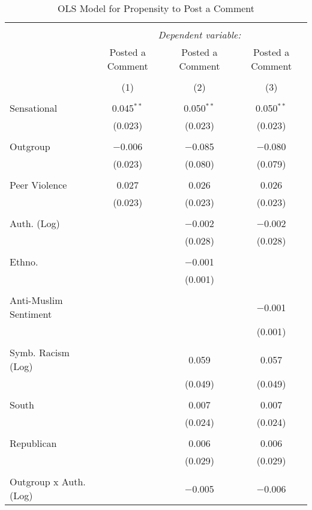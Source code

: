 
\begin{table}[H] \centering 
  \caption{OLS Model for Propensity to Post a Comment} 
  \label{} 
\begin{tabular}{@{\extracolsep{5pt}}lccc} 
\\[-1.8ex]\hline 
\hline \\[-1.8ex] 
 & \multicolumn{3}{c}{\textit{Dependent variable:}} \\ 
\cline{2-4} 
 & Posted a Comment & Posted a Comment & Posted a Comment \\ 
\\[-1.8ex] & (1) & (2) & (3)\\ 
\hline \\[-1.8ex] 
 Sensational & 0.045$^{**}$ & 0.050$^{**}$ & 0.050$^{**}$ \\ 
  & (0.023) & (0.023) & (0.023) \\ 
  & & & \\ 
 Outgroup & $-$0.006 & $-$0.085 & $-$0.080 \\ 
  & (0.023) & (0.080) & (0.079) \\ 
  & & & \\ 
 Peer Violence & 0.027 & 0.026 & 0.026 \\ 
  & (0.023) & (0.023) & (0.023) \\ 
  & & & \\ 
 Auth. (Log) &  & $-$0.002 & $-$0.002 \\ 
  &  & (0.028) & (0.028) \\ 
  & & & \\ 
 Ethno. &  & $-$0.001 &  \\ 
  &  & (0.001) &  \\ 
  & & & \\ 
 Anti-Muslim Sentiment &  &  & $-$0.001 \\ 
  &  &  & (0.001) \\ 
  & & & \\ 
 Symb. Racism (Log) &  & 0.059 & 0.057 \\ 
  &  & (0.049) & (0.049) \\ 
  & & & \\ 
 South &  & 0.007 & 0.007 \\ 
  &  & (0.024) & (0.024) \\ 
  & & & \\ 
 Republican &  & 0.006 & 0.006 \\ 
  &  & (0.029) & (0.029) \\ 
  & & & \\ 
 Outgroup x Auth. (Log) &  & $-$0.005 & $-$0.006 \\ 

\end{tabular}
\end{table}

